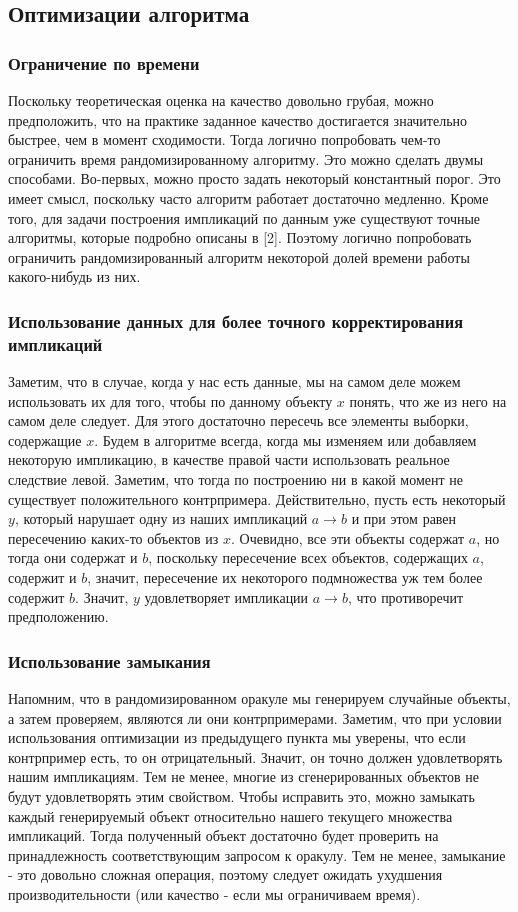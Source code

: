 \subsection{Оптимизации алгоритма}
\subsubsection{Ограничение по времени}
Поскольку теоретическая оценка на качество довольно грубая, можно предположить, что на практике заданное качество достигается значительно быстрее, чем в момент сходимости. Тогда логично попробовать чем-то ограничить время рандомизированному алгоритму. Это можно сделать двумы способами. Во-первых, можно просто задать некоторый константный порог. Это имеет смысл, поскольку часто алгоритм работает достаточно медленно. Кроме того, для задачи построения импликаций по данным уже существуют точные алгоритмы, которые подробно описаны в [2]. Поэтому логично попробовать ограничить рандомизированный алгоритм некоторой долей времени работы какого-нибудь из них.

\subsubsection{Использование данных для более точного корректирования импликаций}
Заметим, что в случае, когда у нас есть данные, мы на самом деле можем использовать их для того, чтобы по данному объекту $x$ понять, что же из него на самом деле следует. Для этого достаточно пересечь все элементы выборки, содержащие $x$. Будем в алгоритме всегда, когда мы изменяем или добавляем некоторую импликацию, в качестве правой части использовать реальное следствие левой. Заметим, что тогда по построению ни в какой момент не существует положительного контрпримера. Действительно, пусть есть некоторый $y$, который нарушает одну из наших импликаций $a \rightarrow b$ и при этом равен пересечению каких-то объектов из $x$. Очевидно, все эти объекты содержат $a$, но тогда они содержат и $b$, поскольку пересечение всех объектов, содержащих $a$, содержит и $b$, значит, пересечение их некоторого подмножества уж тем более содержит $b$. Значит, $y$ удовлетворяет импликации $a \rightarrow b$, что противоречит предположению.

\subsubsection{Использование замыкания}
Напомним, что в рандомизированном оракуле мы генерируем случайные объекты, а затем проверяем, являются ли они контрпримерами. Заметим, что при условии использования оптимизации из предыдущего пункта мы уверены, что если контрпример есть, то он отрицательный. Значит, он точно должен удовлетворять нашим импликациям. Тем не менее, многие из сгенерированных объектов не будут удовлетворять этим свойством. Чтобы исправить это, можно замыкать каждый генерируемый объект относительно нашего текущего множества импликаций. Тогда полученный объект достаточно будет проверить на принадлежность соответствующим запросом к оракулу. Тем не менее, замыкание - это довольно сложная операция, поэтому следует ожидать ухудшения производительности (или качество - если мы ограничиваем время).